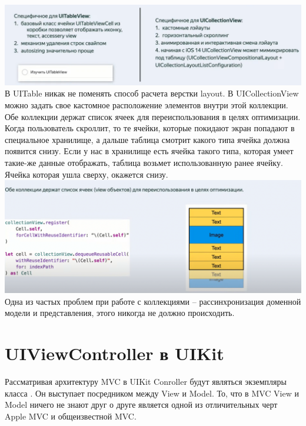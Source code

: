 \documentclass{article}
\begin{document}
    \newline
    \includegraphics[scale = 0.3]{pic/Снимок экрана 2023-08-01 в 01.45.28.png}
    \newline
    В UITable никак не поменять способ расчета верстки layout. В UICollectionView можно задать свое кастомное расположение элементов внутри этой коллекции. 
    \newline
    Обе коллекции держат список ячеек для переиспользования в целях оптимизации. Когда пользователь скроллит, то те ячейки, которые покидают экран попадают в специальное хранилище, а дальше таблица смотрит какого типа ячейка должна появится снизу. Если у нас в хранилище есть ячейка такого типа, которая умеет такие-же данные отображать, таблица возьмет использованную ранее ячейку. Ячейка которая ушла сверху, окажется снизу. 
    \newline
    \includegraphics[scale = 0.2]{pic/Снимок экрана 2023-08-01 в 01.58.17.png}
    \newline
    Одна из частых проблем при работе с коллекциями -- рассинхронизация доменной модели и представления, этого никогда не должно происходить. 
    \section{UIViewController в UIKit}
    Рассматривая архитектуру MVC в UIKit Conroller будут являться экземпляры класса . Он выступает посредником между View и Model. То, что в MVC View и Model ничего не знают друг о друге является одной из отличительных черт Apple MVC и общеизвестной MVC. 
\end{document}
